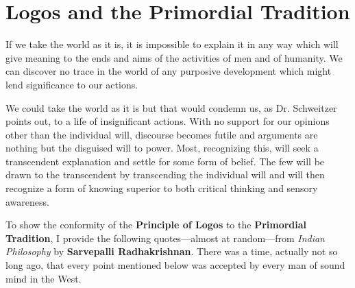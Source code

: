 \section{Logos and the Primordial Tradition}

\begin{quotex}
If we take the world as it is, it is impossible to explain it in any way which will give meaning to the ends and aims of the activities of men and of humanity. We can discover no trace in the world of any purposive development which might lend significance to our actions.
\end{quotex}


We could take the world as it is but that would condemn us, as Dr. Schweitzer points out, to a life of insignificant actions. With no support for our opinions other than the individual will, discourse becomes futile and arguments are nothing but the disguised will to power. Most, recognizing this, will seek a transcendent explanation and settle for some form of belief. The few will be drawn to the transcendent by transcending the individual will and will then recognize a form of knowing superior to both critical thinking and sensory awareness.

To show the conformity of the \textbf{Principle of Logos} to the \textbf{Primordial Tradition}, I provide the following quotes---almost at random---from \emph{Indian Philosophy} by \textbf{Sarvepalli Radhakrishnan}. There was a time, actually not so long ago, that every point mentioned below was accepted by every man of sound mind in the West.

